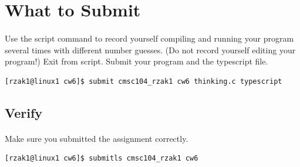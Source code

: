 \documentclass[letter,11pt]{article}
\begin{document}
\section*{What to Submit}
\paragraph{}Use the script command to record yourself compiling and running your program several times with different number guesses. (Do not record yourself editing your program!) Exit from script. Submit your program and the typescript file.
\begin{verbatim}
[rzak1@linux1 cw6]$ submit cmsc104_rzak1 cw6 thinking.c typescript
\end{verbatim}

\subsection*{Verify}
\paragraph{}Make sure you submitted the assignment correctly.
\begin{verbatim}
[rzak1@linux1 cw6]$ submitls cmsc104_rzak1 cw6
\end{verbatim}
\end{document}
